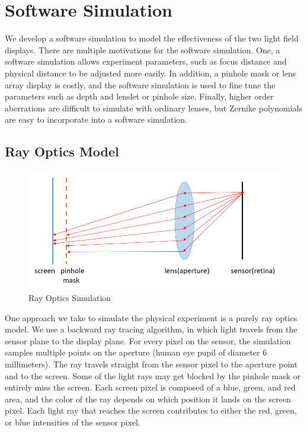 \chapter{Software Simulation}

We develop a software simulation to model the effectiveness of the two light field displays. There are multiple motivations for the software simulation. One, a software simulation allows experiment parameters, such as focus distance and physical distance to be adjusted more easily. In addition, a pinhole mask or lens array display is costly, and the software simulation is used to fine tune the parameters such as depth and lenslet or pinhole size. Finally, higher order aberrations are difficult to simulate with ordinary lenses, but Zernike polynomials are easy to incorporate into a software simulation.

\section{Ray Optics Model}

\begin{figure}[ht]
  \centering
  \includegraphics[width=5in]{chapters/chapter6/images/Ray_Simulation.png}
  \caption{Ray Optics Simulation}
  \label{fig:ray_optics}
\end{figure}

One approach we take to simulate the physical experiment is a purely ray optics model. We use a backward ray tracing algorithm, in which light travels from the sensor plane to the display plane. For every pixel on the sensor, the simulation samples multiple points on the aperture (human eye pupil of diameter 6 millimeters). The ray travels straight from the sensor pixel to the aperture point and to the screen. Some of the light rays may get blocked by the pinhole mask or entirely miss the screen. Each screen pixel is composed of a blue, green, and red area, and the color of the ray depends on which position it lands on the screen pixel. Each light ray that reaches the screen contributes to either the red, green, or blue intensities of the sensor pixel.

